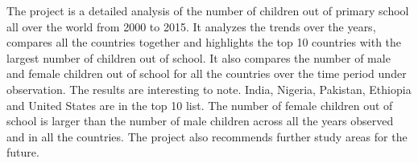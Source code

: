 \documentclass{article}
\begin{document}
The project is a detailed analysis of the number of children out of primary school all over the world from 2000 to 2015. It analyzes the trends over the years, compares all the countries together and highlights the top 10 countries with the largest number of children out of school. It also compares the number of male and female children out of school for all the countries over the time period under observation. The results are interesting to note. India, Nigeria, Pakistan, Ethiopia and United States are in the top 10 list. The number of female children out of school is larger than the number of male children across all the years observed and in all the countries. The project also recommends further study areas for the future.
\end{document}
